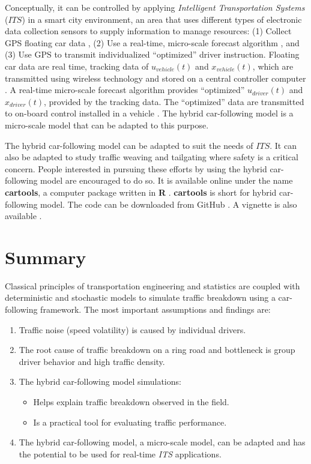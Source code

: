 \documentclass[Proceedings]{ascelike}
\begin{document}
Conceptually, it can be controlled  by applying \emph{Intelligent Transportation Systems} ($ITS$) in a smart city environment, an area that uses different types of electronic data collection sensors to supply information to manage resources: (1) Collect GPS floating car data \cite{KENDZIORRA2016198}, (2) Use a real-time, micro-scale forecast algorithm \cite{trieber}, and (3) Use GPS to transmit individualized ``optimized'' driver instruction. Floating car data are  real time, tracking data of $u_{vehicle}(t)$ and  $x_{vehicle}(t)$, which are transmitted using wireless technology and stored on a central controller computer \cite{tarnoff}. A real-time micro-scale forecast algorithm provides ``optimized'' $u_{driver}(t)$ and  $x_{driver}(t)$, provided by the tracking data. The ``optimized'' data are transmitted to on-board control installed in a vehicle \cite{5gaa}. The hybrid car-following model is a  micro-scale model that can be adapted to this purpose. 
 
The hybrid car-following model can be adapted to suit the needs of $ITS$. It can also be adapted to study traffic weaving and tailgating where  safety is a critical concern. People interested in pursuing these efforts by using the hybrid car-following model are encouraged to do so. It is available online under the name \textbf{cartools}, a computer package written in \textbf{R}  \cite{cran}.   \textbf{cartools} is short for hybrid car-following model. The  code can be downloaded from GitHub  \cite{pjo2018}. A vignette is also available \cite{cartools}. 




\section{Summary}

Classical principles of transportation engineering and statistics are coupled with deterministic and stochastic models  to simulate traffic breakdown  using a car-following framework. The most important assumptions and findings are:


\begin{enumerate}
\item Traffic noise (speed volatility) is caused by individual drivers.
\item The root cause of traffic breakdown on a ring road and bottleneck is group driver behavior and high traffic density.
\item The hybrid car-following model simulations:
\begin{itemize}
\item Helps explain traffic breakdown observed in the field.
\item Is a practical tool for evaluating traffic performance.
\end{itemize}
\item The hybrid car-following model, a micro-scale model,  can be adapted and has the potential to be used for real-time \emph{ITS} applications.
\end{enumerate}
\end{document}
